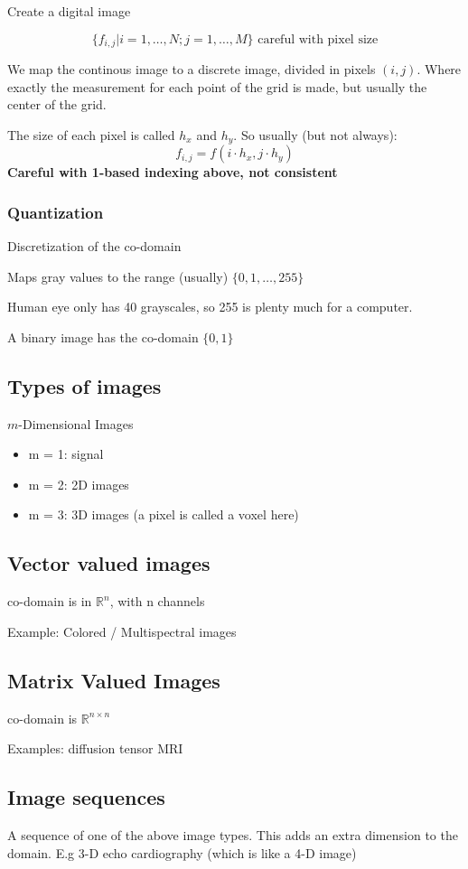 \documentclass{article}
\begin{document}
Create a digital image

\[\{f_{i,j} | i=1,\dots,N; j = 1,\dots, M \} \text{ careful with pixel size}\]

We map the continous image to a discrete image, divided in pixels $(i,j)$. Where exactly the measurement
for each point of the grid is made, but usually the center of the grid.

The size of each pixel is called $h_x$ and $h_y$. So usually (but not always):
\[f_{i,j} = f(i\cdot h_x, j \cdot h_y)\]
\textbf{Careful with 1-based indexing above, not consistent}
\subsubsection{Quantization}
Discretization of the co-domain

Maps gray values to the range (usually) $\{0,1,\dots,255\}$

Human eye only has 40 grayscales, so 255 is plenty much for a computer.

A binary image has the co-domain $\{0,1\}$

\subsection{Types of images}
$m$-Dimensional Images
\begin{itemize}
  \item m = 1: signal
  \item m = 2: 2D images
  \item m = 3: 3D images (a pixel is called a voxel here)
\end{itemize}
\subsection{Vector valued images}
co-domain is in $\mathbb{R}^n$, with n channels

Example: Colored / Multispectral images

\subsection{Matrix Valued Images}
co-domain is $\mathbb{R}^{n\times n}$

Examples: diffusion tensor MRI

\subsection{Image sequences}
A sequence of one of the above image types. This adds an extra dimension to the domain. E.g 3-D echo cardiography (which is like a 4-D image)
\end{document}
